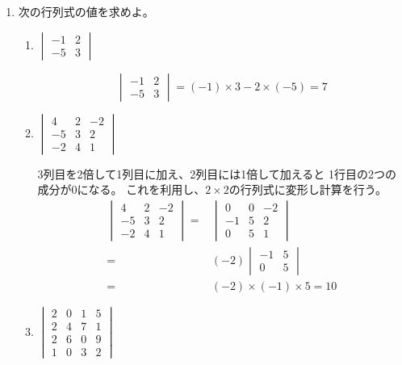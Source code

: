 \documentclass[10pt,b5paper]{ltjsarticle}
\begin{document}
\begin{enumerate}
 \item 次の行列式の値を求めよ。
       \begin{enumerate}
        \item $\begin{vmatrix} -1 & 2\\-5 & 3 \end{vmatrix}$

              \dotfill

              \begin{equation}
               \begin{vmatrix} -1 & 2\\-5 & 3 \end{vmatrix}
               = (-1)\times 3 - 2\times (-5)
                = 7
              \end{equation}

              \hrulefill
        \item $\begin{vmatrix} 4 & 2 & -2\\-5 & 3 & 2\\-2 & 4 & 1 \end{vmatrix}$

              \dotfill

              3列目を2倍して1列目に加え、2列目には1倍して加えると
              1行目の2つの成分が0になる。
              これを利用し、$2\times 2$の行列式に変形し計算を行う。
              \begin{align}
               \begin{vmatrix} 4 & 2 & -2\\-5 & 3 & 2\\-2 & 4 & 1 \end{vmatrix}
               =&\begin{vmatrix} 0 & 0 & -2\\-1 & 5 & 2\\0 & 5 & 1 \end{vmatrix}\\
               =& (-2)\begin{vmatrix} -1 & 5\\0 & 5 \end{vmatrix}\\
               =& (-2)\times (-1) \times 5 = 10
              \end{align}

              \hrulefill
        \item $\begin{vmatrix}
               2 & 0 & 1 & 5\\
               2 & 4 & 7 & 1\\
               2 & 6 & 0 & 9\\
               1 & 0 & 3 & 2
               \end{vmatrix}$


\end{enumerate}
\end{enumerate}
\end{document}
